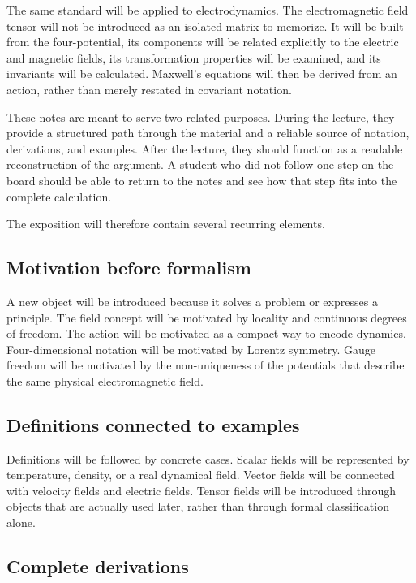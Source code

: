 The same standard will be applied to electrodynamics. The electromagnetic field tensor will not be introduced as an isolated matrix to memorize. It will be built from the four-potential, its components will be related explicitly to the electric and magnetic fields, its transformation properties will be examined, and its invariants will be calculated. Maxwell's equations will then be derived from an action, rather than merely restated in covariant notation.

These notes are meant to serve two related purposes. During the lecture, they provide a structured path through the material and a reliable source of notation, derivations, and examples. After the lecture, they should function as a readable reconstruction of the argument. A student who did not follow one step on the board should be able to return to the notes and see how that step fits into the complete calculation.

The exposition will therefore contain several recurring elements.

\subsection*{Motivation before formalism}

A new object will be introduced because it solves a problem or expresses a principle. The field concept will be motivated by locality and continuous degrees of freedom. The action will be motivated as a compact way to encode dynamics. Four-dimensional notation will be motivated by Lorentz symmetry. Gauge freedom will be motivated by the non-uniqueness of the potentials that describe the same physical electromagnetic field.

\subsection*{Definitions connected to examples}

Definitions will be followed by concrete cases. Scalar fields will be represented by temperature, density, or a real dynamical field. Vector fields will be connected with velocity fields and electric fields. Tensor fields will be introduced through objects that are actually used later, rather than through formal classification alone.

\subsection*{Complete derivations}

